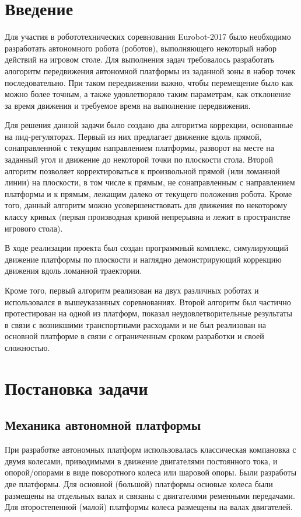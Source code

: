 \documentclass[12pt]{report}
\begin{document}
\newpage
\tableofcontents

\chapter{Введение}
Для участия в робототехнических соревнования Eurobot-2017 было необходимо разработать автономного робота (роботов), выполняющего некоторый набор действий на игровом столе. Для выполнения задач требовалось разработать алогоритм передвижения автономной платформы из заданной зоны в набор точек последовательно. При таком передвижении важно, чтобы перемещение было как можно более точным, а также удовлетворяло таким параметрам, как отклонение за время движения и требуемое время на выполнение передвижения.

Для решения данной задачи было создано два алгоритма коррекции, основанные на пид-регуляторах. Первый из них предлагает движение вдоль прямой, сонаправленной с текущим направлением платформы, разворот на месте на заданный угол и движение до некоторой точки по плоскости стола. Второй алгоритм позволяет корректироваться к произвольной прямой (или ломанной линии) на плоскости, в том числе к прямым, не сонаправленным с направлением платформы и к прямым, лежащим далеко от текущего положения робота. Кроме того, данный алгоритм можно усовершенствовать для движения по некоторому классу кривых (первая производная кривой непрерывна и лежит в пространстве игрового стола).

В ходе реализации проекта был создан программный комплекс, симулирующий движение платформы по плоскости и наглядно демонстрирующий коррекцию движения вдоль ломанной траектории.

Кроме того, первый алгоритм реализован на двух различных роботах и использовался в вышеуказанных соревнованиях. Второй алгоритм был частично протестирован на одной из платформ, показал неудовлетворительные результаты в связи с возникшими транспортными расходами и не был реализован на основной платформе в связи с ограниченным сроком разработки и своей сложностью.

\chapter{Постановка задачи}

\section{Механика автономной платформы}
При разработке автономных платформ использовалась классическая компановка с двумя колесами, приводимыми в движение двигателями постоянного тока, и опорой/опорами в виде поворотного колеса или шаровой опоры. Были разработы две платформы. Для основной (большой) платформы основые колеса были размещены на отдельных валах и связаны с двигателями ременными передачами. Для второстепенной (малой) платформы колеса размещены на валах двигателей.
\end{document}
